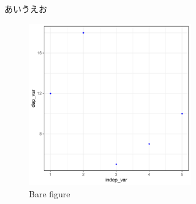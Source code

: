 \documentclass[12pt, a4paper]{scrartcl}
\begin{document}
あいうえお
\begin{figure}
\centering
\includegraphics[width=7cm]{../../../04_analyze/scatter_regress/figure/figure.pdf}

\label{fig:img1}
\caption{Bare figure}
\end{figure}



\end{document}
